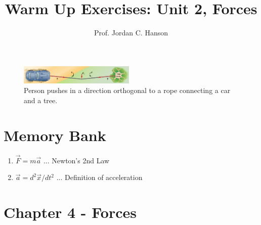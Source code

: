\documentclass{article}
\begin{document}
\twocolumn

\title{Warm Up Exercises: Unit 2, Forces}
\author{Prof. Jordan C. Hanson}

\maketitle

\begin{figure}[ht]
\centering
\includegraphics[width=0.49\textwidth]{figures/rope.jpeg}
\caption{\label{fig:1} Person pushes in a direction orthogonal to a rope connecting a car and a tree.}
\end{figure}

\section{Memory Bank}

\begin{enumerate}
\item $\vec{F} = m \vec{a}$ ... Newton's 2nd Law
\item $\vec{a} = d^2\vec{x}/dt^2$ ... Definition of acceleration
\end{enumerate}

\section{Chapter 4 - Forces}
\end{document}
